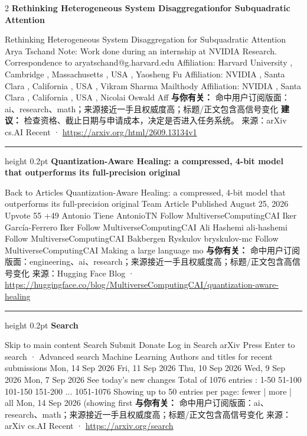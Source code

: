 \documentclass[10.5pt]{ctexart}
\begin{document}
\begin{multicols}{2}
{\large\bfseries Rethinking Heterogeneous System Disaggregationfor Subquadratic Attention}\par
Rethinking Heterogeneous System Disaggregation for Subquadratic Attention Arya Tschand Note: Work done during an internship at NVIDIA Research. Correspondence to aryatschand@g.harvard.edu Affiliation: Harvard University , Cambridge , Massachusetts , USA , Yaosheng Fu Affiliation: NVIDIA , Santa Clara , California , USA , Vikram Sharma Mailthody Affiliation: NVIDIA , Santa Clara , California , USA , Nicolai Oswald Aff
\textbf{与你有关：} 命中用户订阅版面：ai、research、math；来源接近一手且权威度高；标题/正文包含高信号变化
\textbf{建议：} 检查资格、截止日期与申请成本，决定是否进入任务系统。
{\footnotesize\color{ormuted} 来源：arXiv cs.AI Recent · \url{https://arxiv.org/html/2609.13134v1}}
\vspace{2mm}
\hrule height 0.2pt
\vspace{2mm}
{\large\bfseries Quantization-Aware Healing: a compressed, 4-bit model that outperforms its full-precision original}\par
Back to Articles Quantization-Aware Healing: a compressed, 4-bit model that outperforms its full-precision original Team Article Published August 25, 2026 Upvote 55 +49 Antonio Tiene AntonioTN Follow MultiverseComputingCAI Iker García-Ferrero Iker Follow MultiverseComputingCAI Ali Hashemi ali-hashemi Follow MultiverseComputingCAI Bakbergen Ryskulov bryskulov-mc Follow MultiverseComputingCAI Making a large language mo
\textbf{与你有关：} 命中用户订阅版面：engineering、ai、research；来源接近一手且权威度高；标题/正文包含高信号变化
{\footnotesize\color{ormuted} 来源：Hugging Face Blog · \url{https://huggingface.co/blog/MultiverseComputingCAI/quantization-aware-healing}}
\vspace{2mm}
\hrule height 0.2pt
\vspace{2mm}
{\large\bfseries Search}\par
Skip to main content Search Submit Donate Log in Search arXiv Press Enter to search · Advanced search Machine Learning Authors and titles for recent submissions Mon, 14 Sep 2026 Fri, 11 Sep 2026 Thu, 10 Sep 2026 Wed, 9 Sep 2026 Mon, 7 Sep 2026 See today's new changes Total of 1076 entries : 1-50 51-100 101-150 151-200 ... 1051-1076 Showing up to 50 entries per page: fewer | more | all Mon, 14 Sep 2026 (showing first 
\textbf{与你有关：} 命中用户订阅版面：ai、research、math；来源接近一手且权威度高；标题/正文包含高信号变化
{\footnotesize\color{ormuted} 来源：arXiv cs.AI Recent · \url{https://arxiv.org/search}}

\end{multicols}
\end{document}
